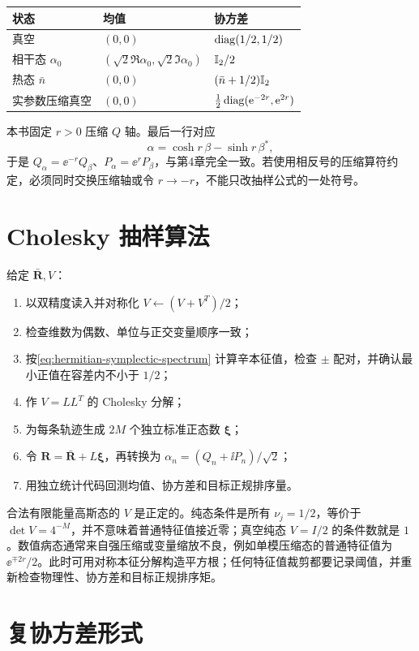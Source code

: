 \begin{center}
\begin{tabular}{lll}
\toprule
状态 & 均值 & 协方差 \\
\midrule
真空 & $(0,0)$ & $\operatorname{diag}(1/2,1/2)$ \\
相干态 $\alpha_0$ & $(\sqrt2\Re\alpha_0,\sqrt2\Im\alpha_0)$ & $\mathbb{I}_2/2$ \\
热态 $\bar n$ & $(0,0)$ & $(\bar n+1/2)\mathbb{I}_2$ \\
实参数压缩真空 & $(0,0)$ & $\tfrac12\operatorname{diag}(\mathrm{e}^{-2r},\mathrm{e}^{2r})$ \\
\bottomrule
\end{tabular}
\end{center}
本书固定 $r>0$ 压缩 $Q$ 轴。最后一行对应
\begin{equation}
  \alpha=\cosh r\,\beta-\sinh r\,\beta^*,
\end{equation}
于是 $Q_\alpha=\ee^{-r}Q_\beta$、$P_\alpha=\ee^rP_\beta$，与第4章完全一致。若使用相反号的压缩算符约定，必须同时交换压缩轴或令 $r\to-r$，不能只改抽样公式的一处符号。

\section{Cholesky 抽样算法}

给定 $\bar{\bm R},V$：
\begin{enumerate}
  \item 以双精度读入并对称化 $V\leftarrow(V+V^T)/2$；
  \item 检查维数为偶数、单位与正交变量顺序一致；
  \item 按\cref{eq:hermitian-symplectic-spectrum} 计算辛本征值，检查 $\pm$ 配对，并确认最小正值在容差内不小于 $1/2$；
  \item 作 $V=LL^T$ 的 Cholesky 分解；
  \item 为每条轨迹生成 $2M$ 个独立标准正态数 $\bm\xi$；
  \item 令 $\bm R=\bar{\bm R}+L\bm\xi$，再转换为
  $\alpha_n=(Q_n+\ii P_n)/\sqrt2$；
  \item 用独立统计代码回测均值、协方差和目标正规排序量。
\end{enumerate}
合法有限能量高斯态的 $V$ 是正定的。纯态条件是所有 $\nu_j=1/2$，等价于 $\det V=4^{-M}$，并不意味着普通特征值接近零；真空纯态 $V=I/2$ 的条件数就是 $1$。数值病态通常来自强压缩或变量缩放不良，例如单模压缩态的普通特征值为 $\ee^{\mp2r}/2$。此时可用对称本征分解构造平方根；任何特征值裁剪都要记录阈值，并重新检查物理性、协方差和目标正规排序矩。

\section{复协方差形式}


